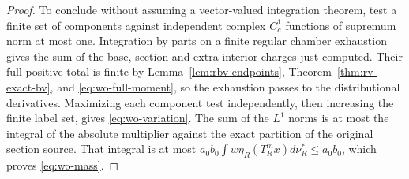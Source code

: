 \begin{proof}
To conclude without assuming a vector-valued integration theorem,
test a finite set of components against independent complex
$C_c^1$ functions of supremum norm at most one.  Integration by
parts on a finite regular chamber exhaustion gives the sum of
the base, section and extra interior charges just computed.
Their full positive total is finite by Lemma~\ref{lem:rbv-endpoints}, Theorem~\ref{thm:rv-exact-bv}, and
\eqref{eq:wo-full-moment}, so the exhaustion passes to the
distributional derivatives.  Maximizing each component test
independently, then increasing the finite label set, gives
\eqref{eq:wo-variation}.  The sum of the $L^1$ norms is at most
the integral of the absolute multiplier against the exact
partition of the original section source.  That integral is
at most $a_0b_0\int w\eta_R(T_R^mx)d\nu_R^*\le a_0b_0$,
which proves \eqref{eq:wo-mass}.
\end{proof}

